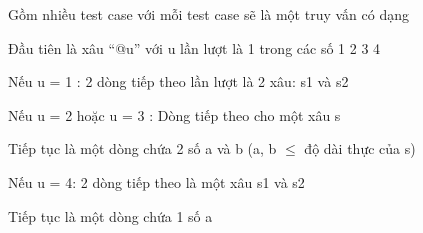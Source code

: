 Gồm nhiều test case với mỗi test case sẽ là một truy vấn có dạng

Đầu tiên là xâu “@u” với u lần lượt là 1 trong các số 1 2 3 4

Nếu u = 1 : 2 dòng tiếp theo lần lượt là 2 xâu: s1 và s2

Nếu u = 2 hoặc u = 3 : Dòng tiếp theo cho một xâu s

Tiếp tục là một dòng chứa 2 số a và b (a, b  $\le$  độ dài thực của s)

Nếu u = 4: 2 dòng tiếp theo là một xâu s1 và s2

Tiếp tục là một dòng chứa 1 số a

 

\